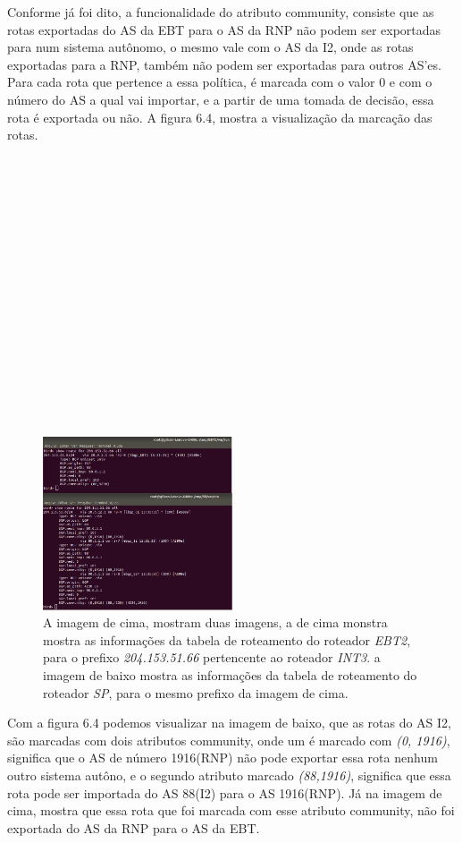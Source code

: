 \documentclass[12pt,a4paper]{report}
\begin{document}
Conforme j\'a foi dito, a funcionalidade do atributo community, consiste que as rotas exportadas do AS da EBT para o AS da RNP n\~ao podem ser exportadas para num sistema aut\^onomo, o mesmo vale com o AS da I2, onde as rotas exportadas para a RNP, tamb\'em n\~ao podem ser exportadas para outros AS'es. Para cada rota que pertence a essa pol\'itica, \'e marcada com o valor 0 e com o n\'umero do AS a qual vai importar, e a partir de uma tomada de decis\~ao, essa rota \'e exportada ou n\~ao. A figura 6.4, mostra a visualiza\c{c}\~ao da marca\c{c}\~ao das rotas.
\\
\\
\\
\\
\\
\\
\\
\\
\\
\\
\\
\\
\\
\\
\\
\\
\\
\begin{figure}[!htb]
 \centering
 \includegraphics[width=0.5\textwidth]{Imagens/COMMUNITY}
  \caption{\label{fig:imagem11} A imagem de cima, mostram duas imagens, a de cima monstra mostra as informa\c{c}\~oes da tabela de roteamento do roteador \textit{EBT2}, para o prefixo \textit{204.153.51.66} pertencente ao roteador \textit{INT3}. a imagem de baixo mostra as informa\c{c}\~oes da tabela de roteamento do roteador \textit{SP}, para o mesmo prefixo da imagem de cima.}
\end{figure}

Com a figura 6.4 podemos visualizar na imagem de baixo, que as rotas do AS I2, s\~ao marcadas com dois atributos community, onde um \'e marcado com \textit{(0, 1916)}, significa que o AS de n\'umero 1916(RNP) n\~ao pode exportar essa rota nenhum outro sistema aut\^ono, e o segundo atributo marcado \textit{(88,1916)}, significa que essa rota pode ser importada do AS 88(I2) para o AS 1916(RNP). J\'a na imagem de cima, mostra que essa rota que foi marcada com esse atributo community, n\~ao foi exportada do AS da RNP para o AS da EBT.
\end{document}
